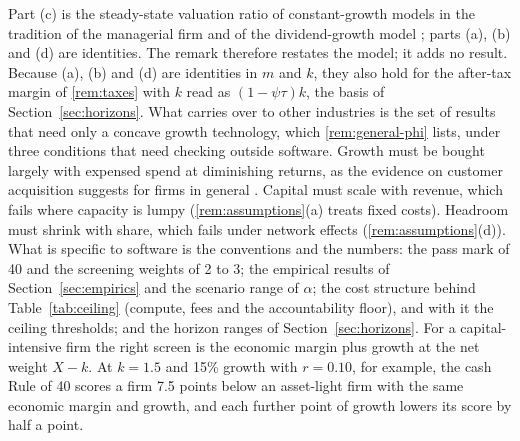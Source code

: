 Part (c) is the steady-state valuation ratio of constant-growth models in the tradition of the managerial firm \citep{marris1963model,marris1964economic} and of the dividend-growth model \citep{gordon1962investment}; parts (a), (b) and (d) are identities. The remark therefore restates the model; it adds no result. Because (a), (b) and (d) are identities in $m$ and $k$, they also hold for the after-tax margin of \autoref{rem:taxes} with $k$ read as $(1-\psi\tau)k$, the basis of Section~\ref{sec:horizons}. What carries over to other industries is the set of results that need only a concave growth technology, which \autoref{rem:general-phi} lists, under three conditions that need checking outside software. Growth must be bought largely with expensed spend at diminishing returns, as the evidence on customer acquisition suggests for firms in general \citep{fitzgerald2024how,argente2025how}. Capital must scale with revenue, which fails where capacity is lumpy (\autoref{rem:assumptions}(a) treats fixed costs). Headroom must shrink with share, which fails under network effects (\autoref{rem:assumptions}(d)). What is specific to software is the conventions and the numbers: the pass mark of 40 and the screening weights of 2 to 3; the empirical results of Section~\ref{sec:empirics} and the scenario range of $\alpha$; the cost structure behind Table~\ref{tab:ceiling} (compute, fees and the accountability floor), and with it the ceiling thresholds; and the horizon ranges of Section~\ref{sec:horizons}. For a capital-intensive firm the right screen is the economic margin plus growth at the net weight $X-k$. At $k=1.5$ and 15\% growth with $r=0.10$, for example, the cash Rule of 40 scores a firm 7.5 points below an asset-light firm with the same economic margin and growth, and each further point of growth lowers its score by half a point.
